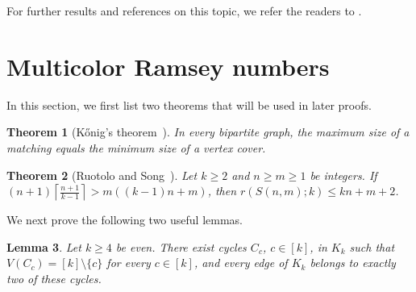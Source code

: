 \documentclass[11pt]{article}
\newtheorem{theorem}{Theorem}[section]
\newtheorem{lemma}[theorem]{Lemma}
\theoremstyle{definition}
\theoremstyle{remark}
\begin{document}
For further results and references
on this topic, we refer the readers to \cite{DasReedSkokan,HuEtAlBookCycle,Radziszowski}.









\section{Multicolor Ramsey numbers}
In this section, we first list two theorems that will be used in later proofs.
\begin{theorem}[K\H{o}nig's theorem~\cite{Konig}]
\label{thm:konig}
In every bipartite graph, the maximum size of a matching equals
the minimum size of a vertex cover.
\end{theorem}

\begin{theorem}[Ruotolo and
Song~\cite{RuotoloSong}]
\label{thm:ruotolo-song-upper}
Let \(k\ge2\) and \(n\ge m\ge1\) be integers. If
\((n+1)\left\lceil\frac{n+1}{k-1}\right\rceil
>m((k-1)n+m)\), then
\(r(S(n,m);k)\le kn+m+2\).
\end{theorem}

We next prove the following two useful lemmas.
\begin{lemma}\label{lem:cycle-cover}
Let \(k\ge4\) be even. There exist cycles \(C_c\), \(c\in[k]\), in
\(K_k\) such that \(V(C_c)=[k]\setminus\{c\}\) for every
\(c\in[k]\), and every edge of \(K_k\) belongs to exactly two of
these cycles.
\end{lemma}
\end{document}
